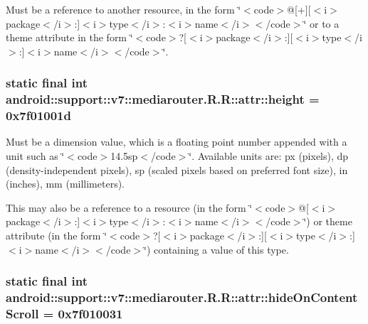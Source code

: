 Must be a reference to another resource, in the form \char`\"{}$<$code$>$@\mbox{[}+\mbox{]}\mbox{[}$<$i$>$package$<$/i$>$:\mbox{]}$<$i$>$type$<$/i$>$:$<$i$>$name$<$/i$>$$<$/code$>$\char`\"{} or to a theme attribute in the form \char`\"{}$<$code$>$?\mbox{[}$<$i$>$package$<$/i$>$:\mbox{]}\mbox{[}$<$i$>$type$<$/i$>$:\mbox{]}$<$i$>$name$<$/i$>$$<$/code$>$\char`\"{}. \hypertarget{classandroid_1_1support_1_1v7_1_1mediarouter_1_1_r_1_1attr_70bd819efbf5b3b4de5221102e17d1e6}{
\subsubsection[{height}]{\setlength{\rightskip}{0pt plus 5cm}static final int android::support::v7::mediarouter.R.R::attr::height = 0x7f01001d}}
\label{classandroid_1_1support_1_1v7_1_1mediarouter_1_1_r_1_1attr_70bd819efbf5b3b4de5221102e17d1e6}


Must be a dimension value, which is a floating point number appended with a unit such as \char`\"{}$<$code$>$14.5sp$<$/code$>$\char`\"{}. Available units are: px (pixels), dp (density-independent pixels), sp (scaled pixels based on preferred font size), in (inches), mm (millimeters). 

This may also be a reference to a resource (in the form \char`\"{}$<$code$>$@\mbox{[}$<$i$>$package$<$/i$>$:\mbox{]}$<$i$>$type$<$/i$>$:$<$i$>$name$<$/i$>$$<$/code$>$\char`\"{}) or theme attribute (in the form \char`\"{}$<$code$>$?\mbox{[}$<$i$>$package$<$/i$>$:\mbox{]}\mbox{[}$<$i$>$type$<$/i$>$:\mbox{]}$<$i$>$name$<$/i$>$$<$/code$>$\char`\"{}) containing a value of this type. \hypertarget{classandroid_1_1support_1_1v7_1_1mediarouter_1_1_r_1_1attr_c4e21a05ce62b4ce3c3386aacb44c125}{
\subsubsection[{hideOnContentScroll}]{\setlength{\rightskip}{0pt plus 5cm}static final int android::support::v7::mediarouter.R.R::attr::hideOnContentScroll = 0x7f010031}}
\label{classandroid_1_1support_1_1v7_1_1mediarouter_1_1_r_1_1attr_c4e21a05ce62b4ce3c3386aacb44c125}


